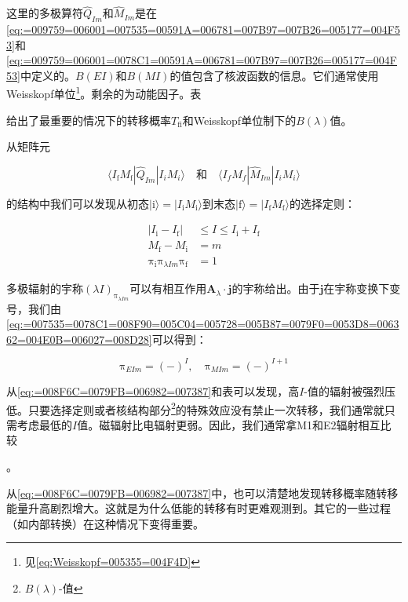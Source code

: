 这里的多极算符$\hat{Q}_{Im}$和$\hat{M}_{Im}$是在\ref{eq:=009759=006001=007535=00591A=006781=007B97=007B26=005177=004F53}和\ref{eq:=009759=006001=0078C1=00591A=006781=007B97=007B26=005177=004F53}中定义的。$B(EI)$和$B(MI)$的值包含了核波函数的信息。它们通常使用Weisskopf单位\footnote{见\ref{eq:Weisskopf=005355=004F4D}}。剩余的为动能因子。表

给出了最重要的情况下的转移概率$T_{\text{fi}}$和Weisskopf单位制下的$B(\lambda)$值。

从矩阵元

\begin{equation}
\langle I_{\text{f}}M_{\text{f}}|\hat{Q}_{Im}|I_{i}M_{i}\rangle\quad\text{和}\quad\langle I_{f}M_{f}|\hat{M}_{Im}|I_{i}M_{i}\rangle
\end{equation}

的结构中我们可以发现从初态$|\text{i}\rangle=|I_{\text{i}}M_{\text{i}}\rangle$到末态$|\text{f}\rangle=|I_{\text{f}}M_{\text{f}}\rangle$的选择定则：

\begin{align}
\left|I_{\text{i}}-I_{\text{f}}\right| & \leq I\leq I_{\text{i}}+I_{\text{f}}\\
M_{\text{f}}-M_{\text{i}} & =m\\
\mathrm{\pi}_{\text{i}}\mathrm{\pi}_{\lambda Im}\mathrm{\pi}_{\text{f}} & =1
\end{align}

多极辐射的宇称$(\lambda I)_{\mathrm{\pi}_{\lambda Im}}$可以有相互作用$\boldsymbol{A}_{\lambda}\cdot\boldsymbol{j}$的宇称给出。由于$\boldsymbol{j}$在宇称变换下变号，我们由\ref{eq:=007535=0078C1=008F90=005C04=005728=005B87=0079F0=0053D8=006362=004E0B=006027=008D28}可以得到：

\begin{equation}
\mathrm{\pi}_{EIm}=(-)^{I},\quad\mathrm{\pi}_{MIm}=(-)^{I+1}
\end{equation}

从\ref{eq:=008F6C=0079FB=006982=007387}和表可以发现，高$I$-值的辐射被强烈压低。只要选择定则或者核结构部分\footnote{$B(\lambda)$-值}的特殊效应没有禁止一次转移，我们通常就只需考虑最低的$I$值。磁辐射比电辐射更弱。因此，我们通常拿M1和E2辐射相互比较

。

从\ref{eq:=008F6C=0079FB=006982=007387}中，也可以清楚地发现转移概率随转移能量升高剧烈增大。这就是为什么低能的转移有时更难观测到。其它的一些过程（如内部转换）在这种情况下变得重要。


